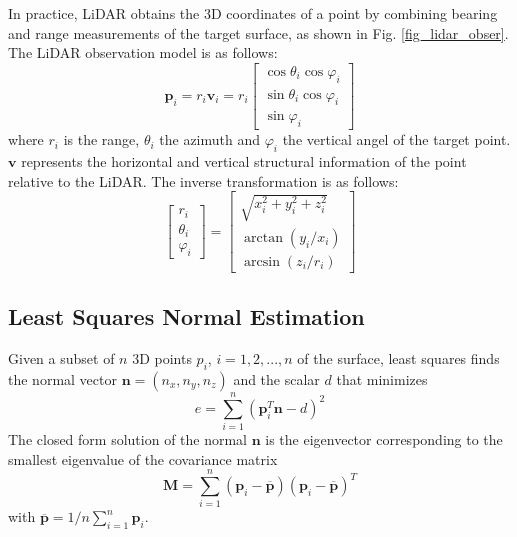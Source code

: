 \documentclass[letterpaper, 10 pt, conference]{ieeeconf}  %
\begin{document}
In practice, LiDAR obtains the 3D coordinates of a point by combining bearing and range measurements of the target surface\cite{yuan2021pixel, yuan2022efficient}, as shown in Fig. \ref{fig_lidar_obser}.
The LiDAR observation model is as follows:
\begin{equation}
        \boldsymbol{p}_i = r_i\boldsymbol{v}_i = r_i \left[\begin{array}{c}
                        \cos \theta_i \cos \varphi_i \\
                        \sin \theta_i \cos \varphi_i \\
                        \sin \varphi_i
                \end{array}\right]
        \label{eq_p_rv}
\end{equation}
where $r_i$ is the range, $\theta_i$ the azimuth and $\varphi_i$ the vertical angel of the target point.
$\boldsymbol{v}$ represents the horizontal and vertical structural information of the point relative to the LiDAR.
The inverse transformation is as follows:
\begin{equation}
        \left[\begin{array}{c}
                        r_i \\ \theta_i  \\ \varphi_i\end{array}\right] =
        \left[\begin{array}{c}\sqrt{x_i^2 + y_i^2 + z_i^2} \\
                        \arctan(y_i / x_i)
                        \\ \arcsin(z_i / r_i)\end{array}\right]
        \label{eq_rtp}
\end{equation}

\subsection{Least Squares Normal Estimation}
\label{sec:ls_ne}
Given a subset of $n$ 3D points $p_i$, $i = 1,2,...,n$ of the surface, least squares finds the normal vector $\boldsymbol{n}=(n_x,n_y,n_z)$ and the scalar $d$ that minimizes
\begin{equation}
        e = \sum_{i = 1}^{n}(\boldsymbol{p}_i^T \boldsymbol{n} - d)^2
        \label{eq_pn_d}
\end{equation}
The closed form solution of the normal $\boldsymbol{n}$ is the eigenvector corresponding to the smallest eigenvalue of the covariance matrix
\begin{equation}
        \boldsymbol{M} = \sum_{i = 1}^{n}(\boldsymbol{p}_i - \overline{\boldsymbol{p}})(\boldsymbol{p}_i - \overline{\boldsymbol{p}})^T
        \label{eq_M}
\end{equation}
with $\overline{\boldsymbol{p}} = 1/n\sum_{i = 1}^{n}\boldsymbol{p}_i$.
\end{document}
